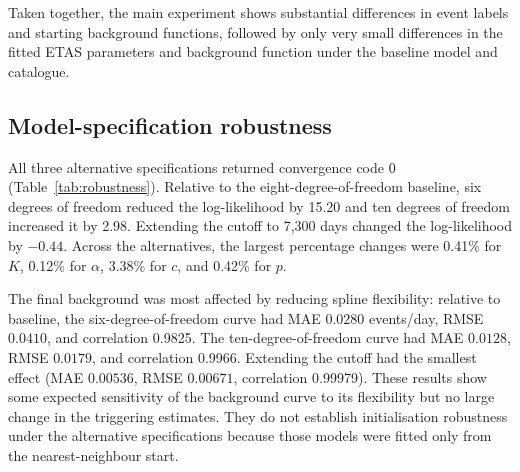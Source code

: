 \begin{table}[htbp]
\centering
\caption{Propagation of differences between initial and final background-rate
functions on a common daily grid. MAE and RMSE are in events/day.}
\label{tab:propagation}
\end{table}

Taken together, the main experiment shows substantial differences in event
labels and starting background functions, followed by only very small
differences in the fitted ETAS parameters and background function under the
baseline model and catalogue.

\subsection{Model-specification robustness}
\label{sec:results_robustness}

All three alternative specifications returned convergence code 0
(Table~\ref{tab:robustness}). Relative to the eight-degree-of-freedom
baseline, six degrees of freedom reduced the log-likelihood by 15.20 and ten
degrees of freedom increased it by 2.98. Extending the cutoff to 7,300 days
changed the log-likelihood by $-0.44$. Across the alternatives, the largest
percentage changes were 0.41\% for $K$, 0.12\% for $\alpha$, 3.38\% for
$c$, and 0.42\% for $p$.

The final background was most affected by reducing spline flexibility:
relative to baseline, the six-degree-of-freedom curve had MAE $0.0280$
events/day, RMSE $0.0410$, and correlation 0.9825. The ten-degree-of-freedom
curve had MAE $0.0128$, RMSE $0.0179$, and correlation 0.9966. Extending the
cutoff had the smallest effect (MAE $0.00536$, RMSE $0.00671$, correlation
0.99979). These results show some expected sensitivity of the background
curve to its flexibility but no large change in the triggering estimates.
They do not establish initialisation robustness under the alternative
specifications because those models were fitted only from the
nearest-neighbour start.

